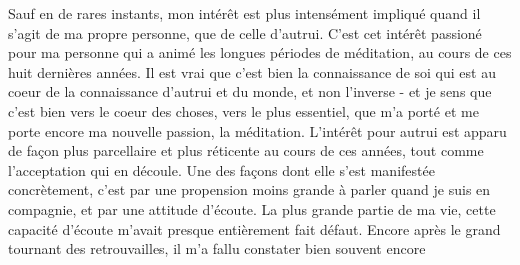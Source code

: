 Sauf en de rares instants, mon intérêt est plus intensément impliqué quand il s'agit de ma propre personne, que de celle d'autrui. C'est cet intérêt passioné pour ma personne qui a animé les longues périodes de méditation, au cours de ces huit dernières années. Il est vrai que c'est bien la connaissance de soi qui est au coeur de la connaissance d'autrui et du monde, et non l'inverse - et je sens que c'est bien vers le coeur des choses, vers le plus essentiel, que m'a porté et me porte encore ma nouvelle passion, la méditation. L'intérêt pour autrui est apparu de façon plus parcellaire et plus réticente au cours de ces années, tout comme l'acceptation qui en découle. Une des façons dont elle s'est manifestée concrètement, c'est par une propension moins grande à parler quand je suis en compagnie, et par une attitude d'écoute. La plus grande partie de ma vie, cette capacité d'écoute m'avait presque entièrement fait défaut. Encore après le grand tournant des retrouvailles, il m'a fallu constater bien souvent encore




